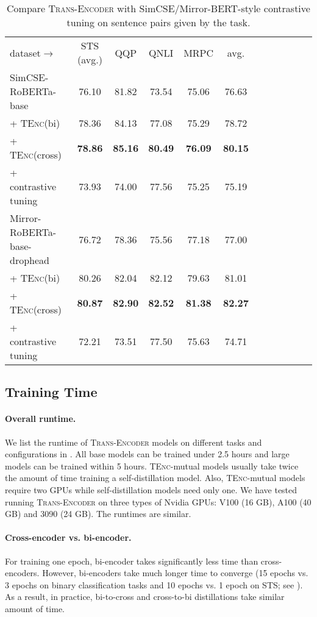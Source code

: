 \documentclass{article} \usepackage{iclr2021_conference,times}
\newcommand{\modelname}{\textsc{Trans-Encoder}\xspace}
\newcommand{\tenc}{\textsc{TEnc}\xspace}
\begin{document}
\begin{table}[!t] \centering
\small
\begin{tabular}{lccccccccccc}
\cmidrule[1.5pt]{1-10}
dataset$\rightarrow$  & STS (avg.) & QQP & QNLI & MRPC & avg.\\
\cmidrule[1.5pt]{1-10}
 SimCSE-RoBERTa-base & 76.10 & 81.82 & 73.54 & 75.06 & 76.63 \\
 + \tenc (bi) & 78.36 & 84.13 & 77.08 & 75.29 & 78.72  \\
 + \tenc (cross) & \textbf{78.86} & \textbf{85.16} & \textbf{80.49} & \textbf{76.09} &  \textbf{80.15} \\
 \hdashline
 + contrastive tuning & 73.93 & 74.00 & 77.56 & 75.25 &  75.19 \\
\cmidrule[1.0pt]{1-10}
 Mirror-RoBERTa-base-drophead & 76.72 & 78.36 & 75.56 & 77.18 & 77.00 \\
 + \tenc (bi) & 80.26 & 82.04 & 82.12 & 79.63 & 81.01 \\
 + \tenc (cross) & \textbf{80.87} & \textbf{82.90} & \textbf{82.52} & \textbf{81.38} & \textbf{82.27} \\
 \hdashline
  + contrastive tuning & 72.21 & 73.51 & 77.50 & 75.63 & 74.71 \\
\cmidrule[1.5pt]{1-10}
\end{tabular}
\caption{Compare \modelname with SimCSE/Mirror-BERT-style contrastive tuning on sentence pairs given by the task.}
\label{tab:label_leak}
\end{table}

\subsection{Training Time}
\paragraph{Overall runtime.} We list the runtime of \modelname models on different tasks and configurations in . All base models can be trained under 2.5 hours and large models can be trained within 5 hours. \tenc-mutual models usually take twice the amount of time training a self-distillation model. Also, \tenc-mutual models require two GPUs while self-distillation models need only one. We have tested running \modelname on three types of Nvidia GPUs: V100 (16 GB), A100 (40 GB) and 3090 (24 GB). The runtimes are similar. 

\paragraph{Cross-encoder vs. bi-encoder.} For training one epoch, bi-encoder takes significantly less time than cross-encoders. However, bi-encoders take much longer time to converge (15 epochs vs. 3 epochs on binary classification tasks and 10 epochs vs. 1 epoch on STS; see ). As a result, in practice, bi-to-cross and cross-to-bi distillations take similar amount of time.
\end{document}
